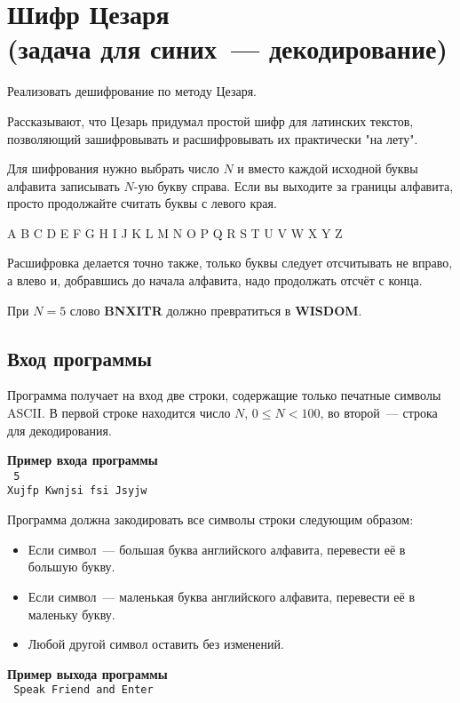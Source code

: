 \documentclass[a4paper,10pt]{article}
\begin{document}
\section*{Шифр Цезаря\\
(задача для синих~--- декодирование)}

Реализовать дешифрование по методу Цезаря.

Рассказывают, что Цезарь придумал простой шифр для латинских текстов, позволяющий зашифровывать и расшифровывать их практически "на лету".

Для шифрования нужно выбрать число $N$ и вместо каждой исходной буквы алфавита записывать $N$-ую букву справа.
Если вы выходите за границы алфавита, просто продолжайте считать буквы с левого края.

\begin{center}
A B C D E F G H I J K L M N O P Q R S T U V W X Y Z
\end{center}

Расшифровка делается точно также, только буквы следует отсчитывать не вправо, а влево и, добравшись до начала алфавита, надо продолжать отсчёт с конца.

При $N = 5$ слово \textbf{BNXITR} должно превратиться в \textbf{WISDOM}.

\subsection*{Вход программы}

Программа получает на вход две строки, содержащие только печатные символы ASCII.
В первой строке находится число $N$, $0 \leq N < 100$, во второй~--- строка для декодирования.

\noindent\textbf{Пример входа программы}\\
\texttt{
5\\
Xujfp Kwnjsi fsi Jsyjw
}

Программа должна закодировать все символы строки следующим образом:

\begin{itemize}
    \item Если символ~--- большая буква английского алфавита, перевести её в большую букву.
    \item Если символ~--- маленькая буква английского алфавита, перевести её в маленьку букву.
    \item Любой другой символ оставить без изменений.
\end{itemize}

\noindent\textbf{Пример выхода программы}\\
\texttt{
Speak Friend and Enter
}
\end{document}
